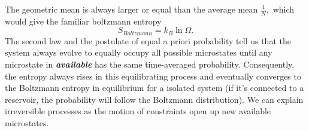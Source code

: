 \documentclass{article}
\theoremstyle{nonumberplain}
\begin{document}
The geometric mean is always larger or equal than the average mean $\frac{1}{N},$ which would give the familiar boltzmann entropy
\[
    \boxed{S_{Boltzmann} = k_B \ln \Omega.}
\]
The second law and the postulate of equal a priori probability tell us that the system always evolve to equally occupy all possible microstates until any microstate in \textit{\textbf{available}} has the same time-averaged probability. Consequently, the entropy always rises in this equilibrating process and eventually converges to the Boltzmann entropy in equilibrium for a isolated system (if it's connected to a reservoir, the probability will follow the Boltzmann distribution). We can explain irreversible processes as the motion of constraints open up new available microstates.
\end{document}

